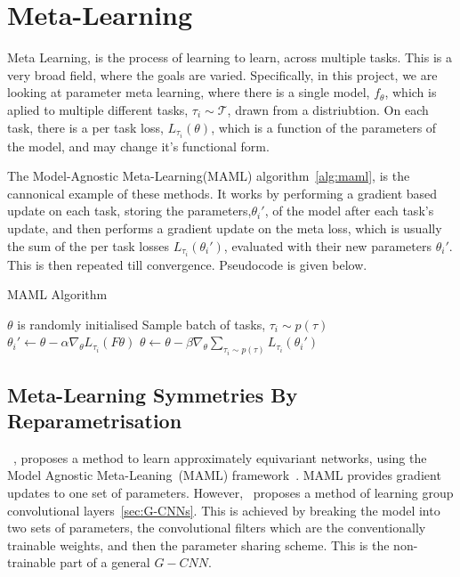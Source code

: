 \section{Meta-Learning}
Meta Learning, is the process of learning to learn, across multiple tasks. This is a very broad field, where the goals are varied. Specifically, in this project, we are looking at parameter meta learning, where there is a single model, $f_\theta$, which is aplied to multiple different tasks, $\tau_i \sim \mathcal{T}$, drawn from a distriubtion.
On each task, there is a per task loss, $L_{\tau_i}(\theta)$, which is a function of the parameters of the model, and may change it's functional form.


The Model-Agnostic Meta-Learning(MAML) algorithm~\ref{alg:maml}, is the cannonical example of these methods. It works by performing a gradient based update on each task, storing the parameters,$\theta_i'$, of the model after each task's update, and then performs a gradient update on the meta loss, which is usually the sum of the per task losses $L_{\tau_i}(\theta_i')$, evaluated with their new parameters $\theta_i'$. This is then repeated till convergence. Pseudocode is given below.


\begin{algorithm}
	\caption{MAML Algorithm}
	\label{alg:maml}
	\begin{algorithmic}
		\State $\theta$ is randomly initialised
		\State Sample batch of tasks, $\tau_i \sim p(\tau)$
		\State $\theta_i' \leftarrow \theta - \alpha \nabla_\theta L_{\tau_i}(F\theta)$
		\EndFor
		\State $\theta \leftarrow \theta - \beta \nabla_\theta \sum_{\tau_i \sim p(\tau)}{L_{\tau_i}(\theta_i')}$
		\EndWhile
	\end{algorithmic}
\end{algorithm}


\subsection{Meta-Learning Symmetries By Reparametrisation}
~\cite{zhou2020meta}, proposes a method to learn approximately equivariant networks, using the Model Agnostic Meta-Leaning~(MAML) framework~\cite{finn2017model}. MAML provides gradient updates to one set of parameters. However,~\cite{zhou2020meta} proposes a method of learning group convolutional layers~\ref{sec:G-CNNs}. This is achieved by breaking the model into two sets of parameters, the convolutional filters which are the conventionally trainable weights, and then the parameter sharing scheme. This is the non-trainable part of a general $G-CNN$.

